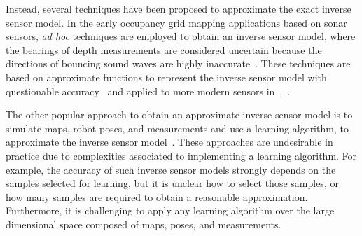 \documentclass[letterpaper, 10pt, conference]{ieeeconf}
\newcommand{\EditTL}[1]{{\color{red}\protect #1}}
\begin{document}
Instead, several techniques have been proposed to approximate the exact inverse sensor model. %
In the early occupancy grid mapping applications based on sonar sensors, \emph{ad hoc} techniques are employed to obtain an inverse sensor model, where the bearings of depth measurements are considered uncertain because the directions of bouncing sound waves are highly inaccurate~\cite{MorElf85,Elf89}.
These techniques are based on approximate functions to represent the inverse sensor model with questionable accuracy~\cite{ChoLynHutKanBurKavThr05} and applied to more modern sensors in~\cite{And09},~\cite{PirRutBisSch11}.

The other popular approach to obtain an approximate inverse sensor model is to simulate maps, robot poses, and measurements and use a learning algorithm, to approximate the inverse sensor model~\cite{Thr01,ThrBurFox05}. These approaches are undesirable in practice due to complexities associated to implementing a learning algorithm. For example, the accuracy of such inverse sensor models strongly depends on the samples selected for learning, but it is unclear how to select those samples, or how many samples are required to obtain a reasonable approximation. Furthermore, it is challenging to apply any learning algorithm over the large dimensional space composed of maps, poses, and measurements. 




\end{document}
